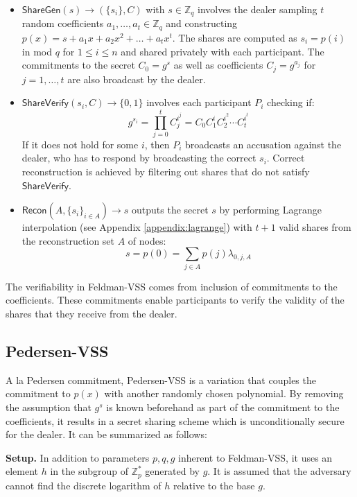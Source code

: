 \documentclass[letterpaper,twocolumn,10pt]{article}
\theoremstyle{definition}
\theoremstyle{remark}
\begin{document}
\begin{itemize}
\item $\mathsf{ShareGen}(s) \rightarrow (\{s_i\}, C)$ with $s \in \mathbb{Z}_q$ involves the dealer sampling $t$ random coefficients $a_1, \ldots, a_t \in \mathbb{Z}_q$ and constructing $p(x) = s + a_1x+ a_2x^2 +\ldots+a_tx^t$. The shares are computed as $s_i = p(i)$ in mod $q$ for $1\le i \le n$ and shared privately with each participant. The commitments to the secret $C_0 = g^s$ as well as coefficients $C_j = g^{a_j}$ for $j = 1,\ldots,t$ are also broadcast by the dealer.
\item $\mathsf{ShareVerify}(s_i, C) \rightarrow \{0, 1\}$ involves each participant $P_i$ checking if:
$$g^{s_i} = \prod_{j = 0}^{t} C_j^{i^j} = C_0 C_1^i C_2^{i^2} \cdots C_{t}^{i^{t}}$$
If it does not hold for some $i$, then $P_i$ broadcasts an accusation against the dealer, who has to respond by broadcasting the correct $s_i$. Correct reconstruction is achieved by filtering out shares that do not satisfy $\mathsf{ShareVerify}$.
\item $\mathsf{Recon}(A, \{s_i\}_{i \in A}) \rightarrow s$ outputs the secret $s$ by performing Lagrange interpolation (see Appendix \ref{appendix:lagrange}) with $t + 1$ valid shares from the reconstruction set $A$ of nodes:
$$s = p(0) = \sum_{j \in A} p(j) \lambda_{0, j, A}$$
\end{itemize}

The verifiability in Feldman-VSS comes from inclusion of commitments to the coefficients. These commitments enable participants to verify the validity of the shares that they receive from the dealer.

\subsection{Pedersen-VSS}
\label{appendix:pedersenVSS}
A la Pedersen commitment, Pedersen-VSS is a variation that couples the commitment to $p(x)$ with another randomly chosen polynomial. By removing the assumption that $g^s$ is known beforehand as part of the commitment to the coefficients, it results in a secret sharing scheme which is unconditionally secure for the dealer. It can be summarized as follows:

\textbf{Setup.} In addition to parameters $p,q,g$ inherent to Feldman-VSS, it uses an element $h$ in the subgroup of $\mathbb{Z}^*_p$ generated by $g$. It is assumed that the adversary cannot find the discrete logarithm of $h$ relative to the base $g$.
\end{document}
